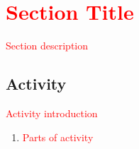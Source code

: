 

\section{\textcolor{red}{Section Title}}
\label{sec:sectiontitle}

\textcolor{red}{Section description}

\subsection*{Activity}

\textcolor{red}{Activity introduction}

\begin{enumerate}[\bf {\thesection}a.]
	\item \textcolor{red}{Parts of activity}
\end{enumerate}


